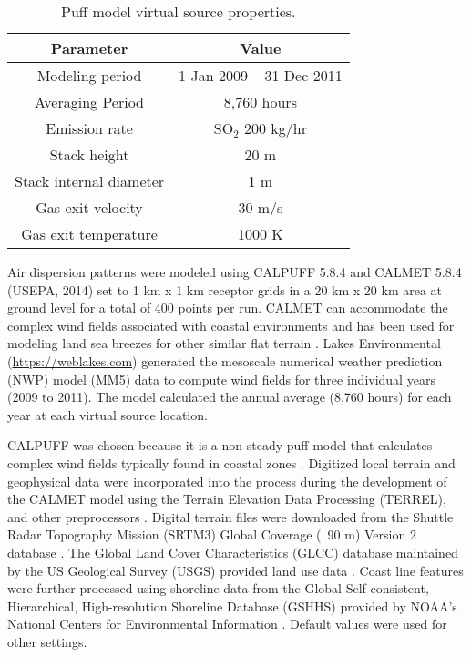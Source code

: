\begin{table}[H]
\centering
\caption{Puff model virtual source properties.}
\label{tb:puffmodel}
\begin{tabular}{@{}cc@{}}
\toprule
\textbf{Parameter}      & \textbf{Value}           \\ \midrule
Modeling period         & 1 Jan 2009 – 31 Dec 2011 \\
Averaging Period        & 8,760 hours              \\
Emission rate           & SO$_{2}$ 200 kg/hr       \\
Stack height            & 20 m                     \\
Stack internal diameter & 1 m                      \\
Gas exit velocity       & 30 m/s                   \\
Gas exit temperature    & 1000 K                   \\ \bottomrule
\end{tabular}
\end{table}

Air dispersion patterns were modeled using CALPUFF 5.8.4 and CALMET 5.8.4  (USEPA, 2014) set to 1 km x 1 km receptor grids in a 20 km x 20 km area at ground level for a total of 400 points per run.  CALMET can accommodate the complex wind fields associated with coastal environments and has been used for modeling land sea breezes for other similar flat terrain \citep{Mangia2010}. Lakes Environmental (\url{https://weblakes.com}) generated the mesoscale numerical weather prediction (NWP) model (MM5) data to compute wind fields for three individual years (2009 to 2011).  The model calculated the annual average (8,760 hours) for each year at each virtual source location. 

CALPUFF was chosen because it is a non-steady puff model that calculates complex wind fields typically found in coastal zones \citep{Ghannam2013a, Indumati2009, USEPA2014, Weiss2014}.  Digitized local terrain and geophysical data were incorporated into the process during the development of the CALMET model using the Terrain Elevation Data Processing (TERREL), and other preprocessors \citep{Scire2000}.  Digital terrain files were downloaded from the Shuttle Radar Topography Mission (SRTM3) Global Coverage (~90 m) Version 2 database \citep{USGS2000}.  The Global Land Cover Characteristics (GLCC) database maintained by the US Geological Survey (USGS) provided land use data \citep{USGS2008}.  Coast line features were further processed using shoreline data from the Global Self-consistent, Hierarchical, High-resolution Shoreline Database (GSHHS) provided by NOAA's National Centers for Environmental Information \citep{NOAA2015}.  Default values were used for other settings.


